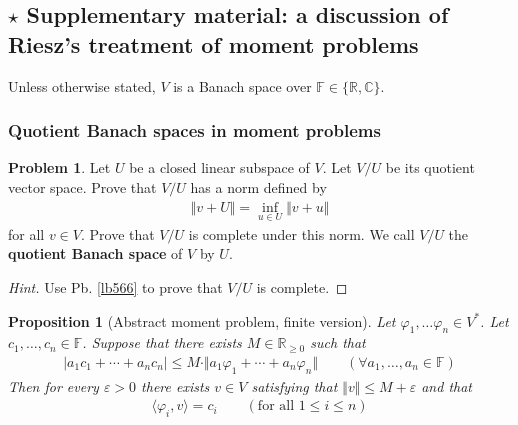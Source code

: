 \documentclass[12pt,b5paper,notitlepage]{article}
\theoremstyle{definition}
\newtheorem{prob}{\color{red}Problem}[section]
\newtheorem{sprob}[prob]{\color{red}$\star$ Problem}
\theoremstyle{plain}
\newtheorem{pp}[df]{Proposition}
\newcommand{\ovl}{\overline}
\newcommand{\bk}[1]{\langle {#1}\rangle}
\newcommand{\Cbb}{\mathbb C}
\newcommand{\Rbb}{\mathbb R}
\newcommand{\Fbb}{\mathbb F}
\newcommand{\eps}{\varepsilon}
\numberwithin{equation}{section}
\begin{document}
\begin{comment}
\begin{sprob}
Let $V$ be a normed vector space such that $V^*$ is separable (under the operator norm). Prove that $V$ is separable. Use this fact to give another proof that \eqref{eq205} is not surjective.
\end{sprob}


\begin{proof}[Hint]
Show that $\ovl B_{V^*}(0,1)$ is second countable under the weak-* topology. Then use Thm. \ref{lb482} and \ref{lb523}. 
\end{proof}
\end{comment}



\subsection{$\star$ Supplementary material: a discussion of Riesz's treatment of moment problems}\label{lb548}

Unless otherwise stated, $V$ is a Banach space over $\Fbb\in\{\Rbb,\Cbb\}$.


\subsubsection{Quotient Banach spaces in moment problems}




\begin{prob}
Let $U$ be a closed linear subspace of $V$. Let $V/U$ be its quotient vector space. Prove that $V/U$ has a norm defined by
\begin{align}
\Vert v+U\Vert=\inf_{u\in U}\Vert v+u\Vert  \label{eq216}
\end{align}
for all $v\in V$. Prove that $V/U$ is complete under this norm. We call $V/U$ the \textbf{quotient Banach space}  of $V$ by $U$.
\end{prob}

\begin{proof}[Hint]
Use Pb. \ref{lb566} to prove that $V/U$ is complete.
\end{proof}

\begin{pp}[Abstract moment problem, finite version]\label{lb546}
Let $\varphi_1,\dots\varphi_n\in V^*$. Let $c_1,\dots,c_n\in\Fbb$. Suppose that there exists $M\in\Rbb_{\geq0}$ such that
\begin{align}
|a_1c_1+\cdots+a_nc_n|\leq M\cdot\Vert a_1\varphi_1+\cdots+a_n\varphi_n\Vert\qquad(\forall a_1,\dots,a_n\in\Fbb)
\end{align}
Then for every $\eps>0$ there exists $v\in V$ satisfying that $\Vert v\Vert\leq M+\eps$ and that
\begin{align}
\bk{\varphi_i,v}=c_i\qquad(\text{for all }1\leq i\leq n) \label{eq213}
\end{align}
\end{pp}
\end{document}
